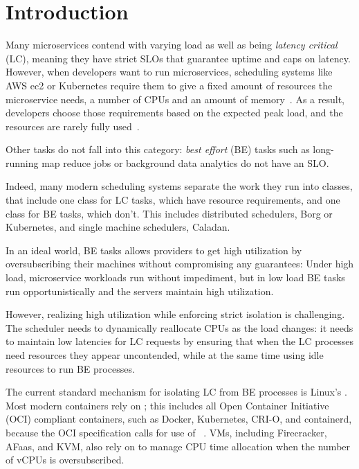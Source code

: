 \section{Introduction}
\label{s:intro}

Many microservices contend with varying load as well as being \textit{latency
critical} (LC), meaning they have strict SLOs that guarantee uptime and caps on
latency. However, when developers want to run microservices, scheduling systems
like AWS ec2 or Kubernetes require them to give a fixed amount of resources the
microservice needs, \ie{} a number of CPUs and an amount of memory~\cite{TODO}.
As a result, developers choose those requirements based on the expected peak
load, and the resources are rarely fully used~\cite{TODO}. 

Other tasks do not fall into this category: \textit{best effort} (BE) tasks such
as long-running map reduce jobs or background data analytics do not have an SLO.

Indeed, many modern scheduling systems separate the work they run into classes,
that include one class for LC tasks, which have resource requirements, and one
class for BE tasks, which don't. This includes distributed schedulers, \eg{}
Borg\cite{TODO} or Kubernetes\cite{TODO}, and single machine schedulers, \eg{}
Caladan\cite{TODO}. 

In an ideal world, BE tasks allows providers to get high utilization by
oversubscribing their machines without compromising any guarantees: Under high
load, microservice workloads run without impediment, but in low load BE tasks
run opportunistically and the servers maintain high utilization.

However, realizing high utilization while enforcing strict isolation is
challenging. The scheduler needs to dynamically reallocate CPUs as the load
changes: it needs to maintain low latencies for LC requests by ensuring that
when the LC processes need resources they appear uncontended, while at the same
time using idle resources to run BE processes.

The current standard mechanism for isolating LC from BE processes is Linux's
\cgroups{}. Most modern containers rely on \cgroups{}; this includes all Open
Container Initiative (OCI) compliant containers, such as Docker, Kubernetes,
CRI-O, and containerd, because the OCI specification calls for use of
\cgroups{}~\cite{TODO}. VMs, including Firecracker, AFaas, and KVM, also rely on
\cgroups{} to manage CPU time allocation when the number of vCPUs is
oversubscribed.~\cite{TODO}

